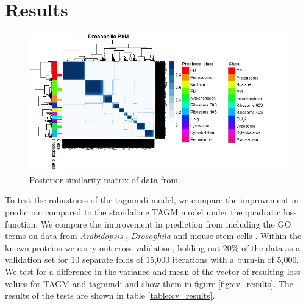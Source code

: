 \documentclass[11pt]{article} %
\begin{document}
\section{Results}
\begin{figure}[h]
\centering
\includegraphics[scale=0.9]{tan_psm_edit}
\caption{Posterior similarity matrix of data from \citet{TanMappingOrganelleProteins2009a}.}
\label{fig:tan_psms}
\end{figure}
To test the robustness of the tagmmdi model, we compare the improvement in prediction compared to the standalone TAGM model under the quadratic loss function. We compare the improvement in prediction from including the GO terms on data from \emph{Arabidopsis} \cite{GroenIdentificationTransGolgiNetwork2014a}, \emph{Drosophila}\cite{TanMappingOrganelleProteins2009a} and mouse stem cells \cite{Christoforoudraftmapmouse2016a}. Within the known proteins we carry out cross validation, holding out $20\%$ of the data as a validation set for 10 separate folds of 15,000 iterations with a burn-in of 5,000. We test for a difference in the variance and mean of the vector of resulting loss values for TAGM and tagmmdi and show them in figure \ref{fig:cv_results}. The results of the tests are shown in table \ref{table:cv_results}.
\end{document}
